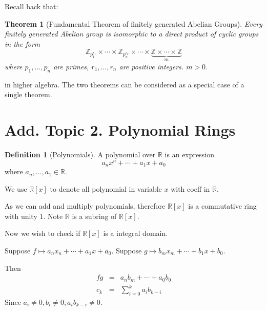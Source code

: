 \documentclass{article}
\theoremstyle{MyNonumberplain}
\theoremstyle{break}
\theoremstyle{break}
\newtheorem{theorem}{Theorem}[section]
\theoremstyle{break}
\theoremstyle{definition}
\theoremstyle{break}
\newtheorem{definition}{Definition}[section]
\begin{document}
Recall back that:

\begin{thmbox}
    \begin{theorem}[Fundamental Theorem of finitely generated Abelian Groups]
    
        Every finitely generated Abelian group is isomorphic to a
        direct product of cyclic groups in the form
        \[ \mathbb{Z}_{p_1^{r_1}} \times \cdots \times \mathbb{Z}_{p_n^{r_n}} \times
           \cdots \times \underset{m}{\underbrace{\mathbb{Z} \times \cdots \times
           \mathbb{Z}}} \]
        where $p_1, \ldots, p_n$ are primes, $r_1, \ldots, r_n$ are positive
        integers. $m > 0$. 
      \end{theorem}
\end{thmbox}
in higher algebra. The two theorems can be considered as a special case of a single theorem.

\newpage

\section{Add. Topic 2. Polynomial Rings}

\begin{defbox}
    \begin{definition}[Polynomials]
        A polynomial over $\mathbb{R}$ is an expression
        \[ a_n x^n + \cdots + a_1 x + a_0 \]
        where $a_n, \ldots, a_1 \in \mathbb{R}$.\bigskip
        
        We use $\mathbb{R} [x]$ to denote all polynomial in variable $x$ with coeff in
        $\mathbb{R}$.
    \end{definition}
\end{defbox}

As we can add and multiply polynomials, therefore $\mathbb{R} [x]$ is a
commutative ring with unity $1$. Note $\mathbb{R}$ is a subring of $\mathbb{R}
[x]$.

Now we wish to check if $\mathbb{R} [x]$ is a integral domain.

Suppose $f \mapsto a_n x_n + \cdots + a_1 x + a_0$. Suppose $g \mapsto b_m
x_m + \cdots + b_1 x + b_0$.

Then
\begin{eqnarray*}
  f g & = & a_n b_m + \cdots + a_0 b_0\\
  c_k & = & \sum^k_{i = 0} a_i b_{k - i}
\end{eqnarray*}
Since $a_i \neq 0, b_i \neq 0, a_i b_{k - i} \neq 0$.
\end{document}
